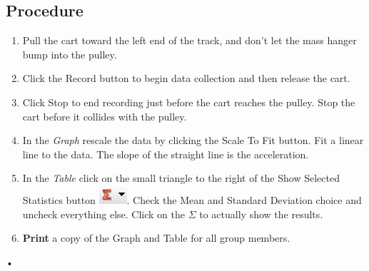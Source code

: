 \documentclass[main.tex]{subfiles}
\begin{document}
\subsection*{Procedure}
\begin{enumerate}
\item
Pull the cart toward the left end of the track, and don't let the mass hanger bump into the pulley.
\item
Click the Record button to begin data collection and then release the cart.
\item
Click Stop to end recording just before the cart reaches the pulley. Stop the cart before it collides with the pulley.
\item
In the \emph{Graph} rescale the data by clicking the Scale To Fit button. Fit a linear line to the data. The slope of the straight line is the acceleration. 
\item
In the \emph{Table} click on the small triangle to the right of the Show Selected Statistics button \includegraphics{Statistics}. Check the Mean and Standard Deviation choice and uncheck everything else. Click on the $\Sigma$ to actually show the results.
\item
\textbf{Print} a copy of the Graph and Table for all group members.
\end{enumerate}•
\end{document}

